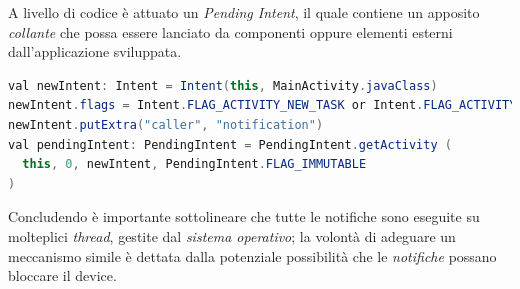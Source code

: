 \documentclass{article}
\begin{document}
A livello di codice è attuato un \textit{Pending Intent}, il quale contiene un apposito \textit{collante} che possa essere lanciato da componenti oppure elementi esterni dall'applicazione sviluppata. 
\begin{lstlisting}[language=JAVA]
val newIntent: Intent = Intent(this, MainActivity.javaClass)
newIntent.flags = Intent.FLAG_ACTIVITY_NEW_TASK or Intent.FLAG_ACTIVITY_CLEAR_TASK
newIntent.putExtra("caller", "notification")
val pendingIntent: PendingIntent = PendingIntent.getActivity (
  this, 0, newIntent, PendingIntent.FLAG_IMMUTABLE
)
\end{lstlisting}
Concludendo è importante sottolineare che tutte le notifiche sono eseguite su molteplici \textit{thread}, gestite dal \textit{sistema operativo}; la volontà di adeguare un meccanismo simile è dettata dalla potenziale possibilità che le \textit{notifiche} possano bloccare il device.
\end{document}
